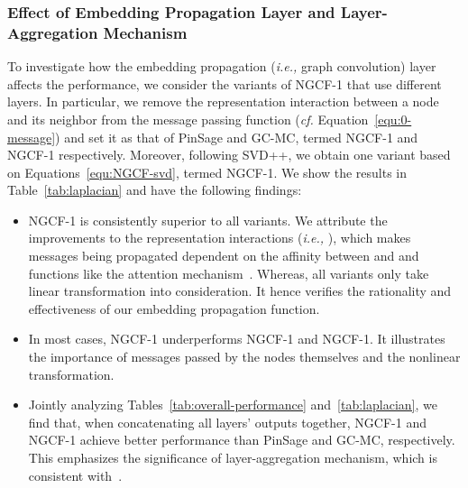 \documentclass[sigconf]{acmart}
\newcommand{\ie}{\emph{i.e., }}
\newcommand{\cf}{\emph{cf. }}
\theoremstyle{definition}
\begin{document}
\subsubsection{\textbf{Effect of Embedding Propagation Layer and Layer-Aggregation Mechanism}}\label{sec:layer-effect}

To investigate how the embedding propagation (\ie graph convolution) layer affects the performance, we consider the variants of NGCF-1 that use different layers.
In particular, we remove the representation interaction between a node and its neighbor from the message passing function (\cf Equation~\eqref{equ:0-message}) and set it as that of PinSage and GC-MC, termed NGCF-1 and NGCF-1 respectively.
Moreover, following SVD++, we obtain one variant based on Equations~\eqref{equ:NGCF-svd}, termed NGCF-1.
We show the results in Table~\ref{tab:laplacian} and have the following findings:

\begin{itemize}[leftmargin=*]
    \item NGCF-1 is consistently superior to all variants. We attribute the improvements to the representation interactions (\ie ), which makes messages being propagated dependent on the affinity between  and  and functions like the attention mechanism~\cite{ACF}. Whereas, all variants only take linear transformation into consideration. It hence verifies the rationality and effectiveness of our embedding propagation function.
    
    \item In most cases, NGCF-1 underperforms NGCF-1 and NGCF-1. It illustrates the importance of messages passed by the nodes themselves and the nonlinear transformation.
    
    \item Jointly analyzing Tables~\ref{tab:overall-performance} and~\ref{tab:laplacian}, we find that, when concatenating all layers' outputs together, NGCF-1 and NGCF-1 achieve better performance than PinSage and GC-MC, respectively.
    This emphasizes the significance of layer-aggregation mechanism, which is consistent with~\cite{JumpKG}.
\end{itemize}
\end{document}
